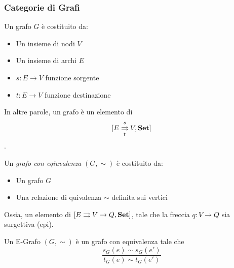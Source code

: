 \documentclass[8pt]{beamer}
\begin{document}
\begin{frame}[fragile]\frametitle{Categorie di Grafi}
	
	\begin{wrapfigure}{R}{0.4\textwidth}
	\end{wrapfigure}
	
	Un grafo $G$ è costituito da:
	\begin{itemize}
		\item Un insieme di nodi $V$
		\item Un insieme di archi $E$
		\item $s: E \to V$ funzione sorgente
		\item $t: E \to V$ funzione destinazione
	\end{itemize}
	In altre parole, un grafo è un elemento di $$[E \mathrel{\mathop{\rightrightarrows}^{s}_{t}} V , \mathbf{Set}]$$.

	Un \emph{grafo con eqiuvalenza} $(G, \sim)$ è costituito da:
	\begin{itemize}
		\item Un grafo $G$
		\item Una relazione di quivalenza $\sim$ definita sui vertici
	\end{itemize}
	Ossia, un elemento di $[E \rightrightarrows V \to Q, \mathbf{Set}]$, tale che la freccia $q: V \to Q$ sia surgettiva (epi).

	Un E-Grafo $(G, \sim)$ è un grafo con equivalenza tale che
	\[
		\frac{s_G(e)\sim s_G(e')}{t_G(e) \sim t_G(e')}
	\]
\end{frame}
\end{document}
